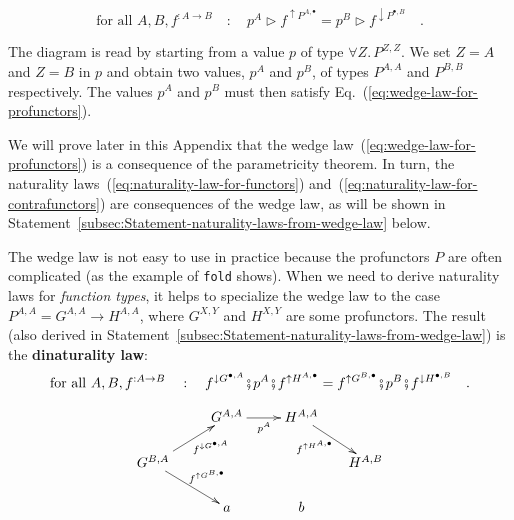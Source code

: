 ~\vspace{-0.8\baselineskip}

\begin{equation}
\text{for all }A,B,f^{:A\rightarrow B}\quad:\quad p^{A}\triangleright f^{\uparrow P^{A,\bullet}}=p^{B}\triangleright f^{\downarrow P^{\bullet,B}}\quad.\label{eq:wedge-law-for-profunctors}
\end{equation}
\vspace{-0.8\baselineskip}

\noindent The diagram is read by starting from a value $p$ of type
$\forall Z.\,P^{Z,Z}$. We set $Z=A$ and $Z=B$ in $p$ and obtain
two values, $p^{A}$ and $p^{B}$, of types $P^{A,A}$ and $P^{B,B}$
respectively. The values $p^{A}$ and $p^{B}$ must then satisfy Eq.~(\ref{eq:wedge-law-for-profunctors}). 

We will prove later in this Appendix that the wedge law~(\ref{eq:wedge-law-for-profunctors})
is a consequence of the parametricity theorem. In turn, the naturality
laws~(\ref{eq:naturality-law-for-functors}) and~(\ref{eq:naturality-law-for-contrafunctors})
are consequences of the wedge law, as will be shown in Statement~\ref{subsec:Statement-naturality-laws-from-wedge-law}
below.

The wedge law is not easy to use in practice because the profunctors
$P$ are often complicated (as the example of \lstinline!fold! shows).
When we need to derive naturality laws for \emph{function types},
it helps to specialize the wedge law to the case $P^{A,A}=G^{A,A}\rightarrow H^{A,A}$,
where $G^{X,Y}$ and $H^{X,Y}$ are some profunctors. The result (also
derived in Statement~\ref{subsec:Statement-naturality-laws-from-wedge-law})
is the \textbf{dinaturality law}:
\begin{equation}
\text{for all }A,B,f^{:A\rightarrow B}\quad:\quad f^{\downarrow G^{\bullet,A}}\bef p^{A}\bef f^{\uparrow H^{A,\bullet}}=f^{\uparrow G^{B,\bullet}}\bef p^{B}\bef f^{\downarrow H^{\bullet,B}}\quad.\label{eq:dinaturality-law-for-profunctors}
\end{equation}

\begin{wrapfigure}[9]{l}{0.38\columnwidth}%
\vspace{-1.3\baselineskip}
\[
\xymatrix{\xyScaleY{1.5pc}\xyScaleX{2.0pc} & G^{A,A}\ar[r]\sb(0.5){p^{A}} & H^{A,A}\ar[rd]\sb(0.4){f^{\uparrow H^{A,\bullet}}}\\
G^{B,A}\ar[rd]\sp(0.55){f^{\uparrow G^{B,\bullet}}}\ar[ru]\sb(0.6){f^{\downarrow G^{\bullet,A}}} &  &  & \negthickspace\negthickspace\negthickspace H^{A,B}\\
 & a & b
}
\]

\vspace{-0.4\baselineskip}
\end{wrapfigure}%

